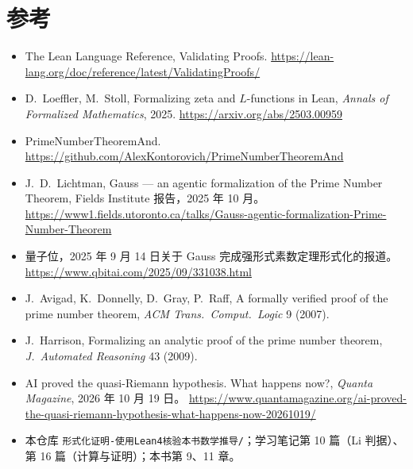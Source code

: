 \documentclass[11pt]{article}
\begin{document}
\section*{参考}
\begin{itemize}
 \item The Lean Language Reference, Validating Proofs. \url{https://lean-lang.org/doc/reference/latest/ValidatingProofs/}
 \item D.\ Loeffler, M.\ Stoll, Formalizing zeta and $L$-functions in Lean, \emph{Annals of Formalized Mathematics}, 2025. \url{https://arxiv.org/abs/2503.00959}
 \item PrimeNumberTheoremAnd. \url{https://github.com/AlexKontorovich/PrimeNumberTheoremAnd}
 \item J.\ D.\ Lichtman, Gauss --- an agentic formalization of the Prime Number Theorem, Fields Institute 报告，2025 年 10 月。 \url{https://www1.fields.utoronto.ca/talks/Gauss-agentic-formalization-Prime-Number-Theorem}
 \item 量子位，2025 年 9 月 14 日关于 Gauss 完成强形式素数定理形式化的报道。 \url{https://www.qbitai.com/2025/09/331038.html}
 \item J.\ Avigad, K.\ Donnelly, D.\ Gray, P.\ Raff, A formally verified proof of the prime number theorem, \emph{ACM Trans.\ Comput.\ Logic} 9 (2007).
 \item J.\ Harrison, Formalizing an analytic proof of the prime number theorem, \emph{J.\ Automated Reasoning} 43 (2009).
 \item AI proved the quasi-Riemann hypothesis. What happens now?, \emph{Quanta Magazine}, 2026 年 10 月 19 日。 \url{https://www.quantamagazine.org/ai-proved-the-quasi-riemann-hypothesis-what-happens-now-20261019/}
 \item 本仓库 \texttt{形式化证明-使用Lean4核验本书数学推导/}；学习笔记第 10 篇（Li 判据）、第 16 篇（计算与证明）；本书第 9、11 章。
\end{itemize}
\end{document}
